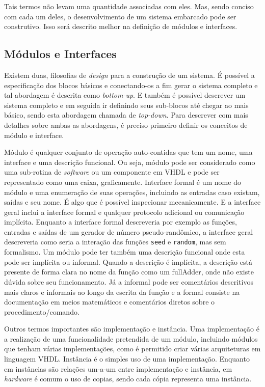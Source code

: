 Tais termos não levam uma quantidade associadas com eles. Mas, sendo conciso com cada um deles, o desenvolvimento de um sistema embarcado pode ser construtivo. Isso será descrito melhor na definição de módulos e interfaces.





\subsection{Módulos e Interfaces}



Existem duas, filosofias de \textit{design} para a construção de um sistema. É possível a especificação dos blocos básicos e conectando-os a fim gerar o sistema completo e tal abordagem é descrita como \textit{bottom-up}. E também é possível descrever um sistema completo e em seguida ir definindo seus sub-blocos até chegar ao mais básico, sendo esta abordagem chamada de \textit{top-down}. Para descrever com mais detalhes sobre ambas as abordagens, é preciso primeiro definir os conceitos de módulo e interface.

Módulo é qualquer conjunto de operação auto-contidas que tem um nome, uma interface e uma descrição funcional. Ou seja, módulo pode ser considerado como uma sub-rotina de \textit{software} ou um componente em VHDL e pode ser representado como uma caixa, graficamente. Interface formal é um nome do módulo e uma enumeração de suas operações, incluindo as entradas caso existam, saídas e seu nome. É algo que é possível inspecionar mecanicamente. E a interface geral inclui a interface formal e qualquer protocolo adicional ou comunicação implícita. Enquanto a interface formal descreveria por exemplo as funções, entradas e saídas de um gerador de número pseudo-randômico, a interface geral descreveria como seria a interação das funções \texttt{seed} e \texttt{random}, mas sem formalismo. Um módulo pode ter também uma descrição funcional onde esta pode ser implícita ou informal. Quando a descrição é implícita, a descrição está presente de forma clara no nome da função como um fullAdder, onde não existe dúvida sobre seu funcionamento. Já a informal pode ser comentários descritivos mais claros e informais ao longo da escrita da função e a formal consiste na documentação em meios matemáticos e comentários diretos sobre o procedimento/comando.

Outros termos importantes são implementação e instância. Uma implementação é a realização de uma funcionalidade pretendida de um módulo, incluindo módulos que tenham várias implementações, como é permitido criar várias arquiteturas em linguagem VHDL. Instância é o simples uso de uma implementação. Enquanto em instâncias são relações um-a-um entre implementação e instância, em \textit{hardware} é comum o uso de copias, sendo cada cópia representa uma instância.



